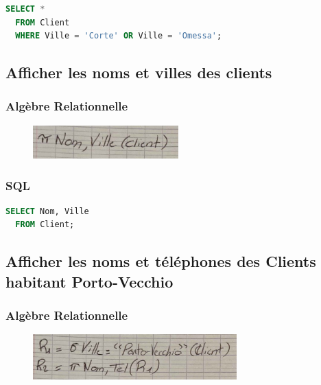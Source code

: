 \documentclass{article}
\begin{document}
\begin{lstlisting}[language=SQL]
  SELECT * 
  FROM Client 
  WHERE Ville = 'Corte' OR Ville = 'Omessa';  
\end{lstlisting}

\subsection{Afficher les noms et villes des clients}

\subsubsection{Algèbre Relationnelle}

\begin{figure}[H]
  \centering
  \includegraphics[width=0.5\textwidth]{alg/2.png}
  \label{fig:alg-rel}
\end{figure}

\subsubsection{SQL}

\begin{lstlisting}[language=SQL]
  SELECT Nom, Ville 
  FROM Client;
\end{lstlisting}

\subsection{Afficher les noms et téléphones des Clients habitant Porto-Vecchio}

\subsubsection{Algèbre Relationnelle}

\begin{figure}[H]
  \centering
  \includegraphics[width=0.7\textwidth]{alg/3.png}
  \label{fig:alg-rel}
\end{figure}
\end{document}
